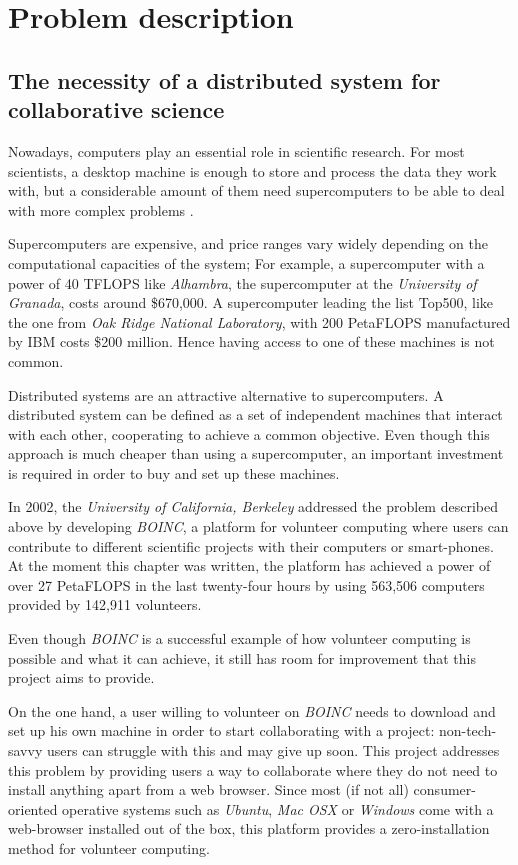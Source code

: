 \chapter{Problem description}
\section{The necessity of a distributed system for collaborative science}
Nowadays, computers play an essential role in scientific research. For most scientists, a desktop machine is enough to store and process the data they work with, but a considerable amount of them need supercomputers to be able to deal with more complex problems \cite{computing-in-science}.

Supercomputers are expensive, and price ranges vary widely depending on the computational capacities of the system; For example, a supercomputer with a power of 40 TFLOPS like \textit{Alhambra}, the supercomputer at the \textit{University of Granada}, costs around \$670,000\cite{ideal-alhambra}. A supercomputer leading the list Top500,  like the one from \textit{Oak Ridge National Laboratory}, with 200 PetaFLOPS manufactured by IBM costs \$200 million\cite{oak-ridge}. Hence having access to one of these machines is not common.

Distributed systems are an attractive alternative to supercomputers. A distributed system can be defined as a set of independent machines that interact with each other, cooperating to achieve a common objective. Even though this approach is much cheaper than using a supercomputer, an important investment is required in order to buy and set up these machines.

In 2002, the \textit{University of California, Berkeley} addressed the problem described above by developing \textit{BOINC}\cite{boinc-website}, a platform for volunteer computing where users can contribute to different scientific projects with their computers or smart-phones. At the moment this chapter was written, the platform has achieved a power of over 27 PetaFLOPS in the last twenty-four hours by using 563,506 computers provided by 142,911 volunteers.

Even though \textit{BOINC} is a successful example of how volunteer computing is possible and what it can achieve, it still has room for improvement that this project aims to provide. 

On the one hand, a user willing to volunteer on \textit{BOINC} needs to download and set up his own machine in order to start collaborating with a project: non-tech-savvy users can struggle with this and may give up soon. This project addresses this problem by providing users a way to collaborate where they do not need to install anything apart from a web browser. Since most (if not all) consumer-oriented operative systems such as \textit{Ubuntu}, \textit{Mac OSX} or \textit{Windows} come with a web-browser installed out of the box, this platform provides a zero-installation method for volunteer computing.

